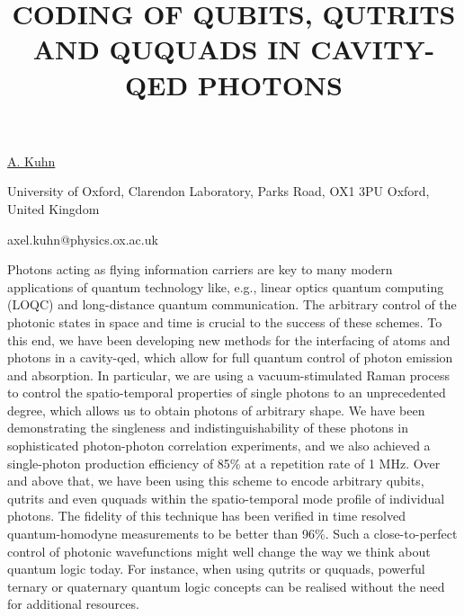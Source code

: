 \title{CODING OF QUBITS, QUTRITS AND QUQUADS IN CAVITY-QED PHOTONS}

\underline{A. Kuhn}

{\normalsize{\vspace{-4mm}
University of Oxford, Clarendon Laboratory, Parks Road, OX1 3PU Oxford, United Kingdom

\email axel.kuhn@physics.ox.ac.uk}}

Photons acting as flying information carriers are key to many modern applications of quantum technology like, e.g., linear optics
quantum computing (LOQC) and long-distance quantum communication. The arbitrary control of the photonic states in space and
time is crucial to the success of these schemes. To this end, we have been developing new methods for the interfacing of atoms
and photons in a cavity-qed, which allow for full quantum control of photon emission and absorption. In particular, we are using a
vacuum-stimulated Raman process to control the spatio-temporal properties of single photons to an unprecedented degree,
which allows us to obtain photons of arbitrary shape. We have been demonstrating the singleness and indistinguishability of these
photons in sophisticated photon-photon correlation experiments, and we also achieved a single-photon production efficiency of
85\% at a repetition rate of 1 MHz. Over and above that, we have been using this scheme to encode arbitrary qubits, qutrits and
even ququads within the spatio-temporal mode profile of individual photons. The fidelity of this technique has been verified in
time resolved quantum-homodyne measurements to be better than 96\%. Such a close-to-perfect control of photonic
wavefunctions might well change the way we think about quantum logic today. For instance, when using qutrits or ququads,
powerful ternary or quaternary quantum logic concepts can be realised without the need for additional resources.

\vspace{\baselineskip}
